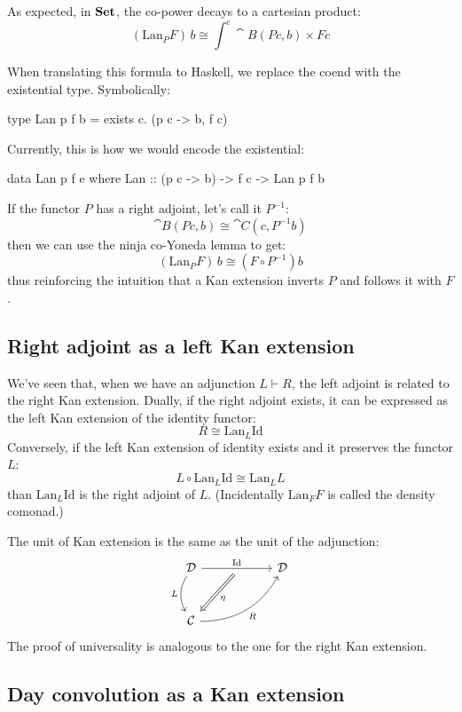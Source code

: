 \documentclass[DaoFP]{subfiles}
\begin{document}
As expected, in $\mathbf{Set}$, the co-power decays to a cartesian product:
\[ (\text{Lan}_P F)\, b \cong \int^{c} \cat B (P c, b) \times F c \]

When translating this formula to Haskell, we replace the coend with the existential type. Symbolically:
 \begin{haskell}
 type Lan p f b = exists c. (p c -> b, f c)
 \end{haskell}
Currently, this is how we would encode the existential:
 \begin{haskell}
 data Lan p f e where
   Lan :: (p c -> b) -> f c -> Lan p f b
 \end{haskell}
 
 If the functor $P$ has a right adjoint, let's call it $P^{-1}$:
 \[ \cat B(P c , b) \cong \cat C(c, P^{-1} b) \]
 then we can use the ninja co-Yoneda lemma to get:
 \[  (\text{Lan}_P F)\, b \cong (F \circ P^{-1}) b \]
 thus reinforcing the intuition that a Kan extension inverts $P$ and follows it with $F$.
 
\subsection{Right adjoint as a left Kan extension}

We've seen that, when we have an adjunction $L \vdash R$, the left adjoint is related to the right Kan extension. Dually, if the right adjoint exists, it can be expressed as the left Kan extension of the identity functor:
\[ R \cong \text{Lan}_L \text{Id} \]
Conversely, if the left Kan extension of identity exists and it preserves the functor $L$:
\[ L \circ \text{Lan}_L \text{Id} \cong \text{Lan}_L L \]
than $\text{Lan}_L \text{Id}$ is the right adjoint of $L$. (Incidentally $\text{Lan}_F F$ is called the density comonad.)

The unit of Kan extension is the same as the unit of the adjunction:
\[
 \begin{tikzcd} [row sep=1cm, column sep=1cm]
 \cat D
 \arrow[rr, "\text{Id}", "" {name=ID, below} ]
 \arrow[d, bend right, "L"']
 && \cat D
 \\
 \cat C
  \arrow[urr, bend right, "R"']
 \arrow[Rightarrow, "\eta",  from=ID]
 \end{tikzcd}
\]
The proof of universality is analogous to the one for the right Kan extension.

\subsection{Day convolution as a Kan extension}
\end{document}

